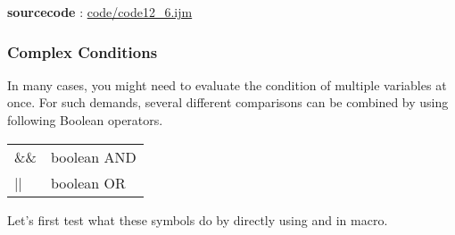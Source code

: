 \textbf{sourcecode} : \href{http://www.example.com/contents}{code/code12\_6.ijm}

\subsubsection{Complex Conditions}
In many cases, you might need to evaluate the condition of multiple variables at once. 
For such demands, several different comparisons can be combined by using following Boolean operators.

\begin{indentCom}

\begin{tabular*}
{0.5\textwidth}{ l l }
\&\& & boolean AND\\
|| & boolean OR\\

\end{tabular*}

\end{indentCom}

Let's first test what these symbols do by directly using
 and  in macro.